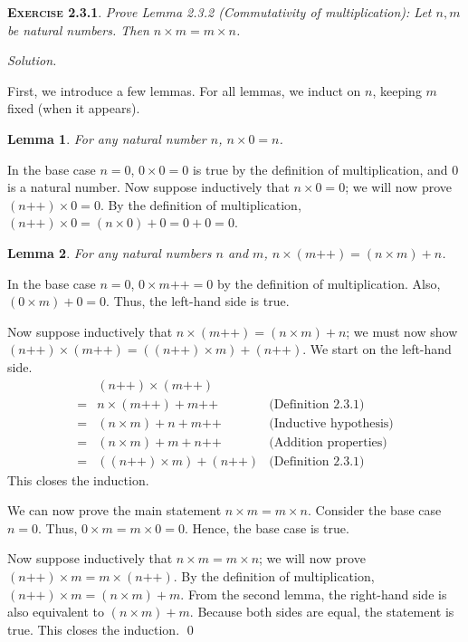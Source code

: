 \documentclass[12pt]{article}
\newcommand{\succr}[1]{#1 \textrm{++}}
\newtheorem*{lemma}{Lemma}
\theoremstyle{remark}
\newenvironment{exer}[2]{
    \noindent \setlength{\parskip}{1em}%
    \textsc{\textbf{Exercise #1}}. \textit{#2} \par
    \noindent \textit{Solution.} %
}{\bigskip}
\begin{document}
\begin{exer}{2.3.1}{
    Prove Lemma 2.3.2 (Commutativity of multiplication):
    Let $n, m$ be natural numbers.
    Then $n \times m = m \times n$.
}
    First, we introduce a few lemmas.
    For all lemmas, we induct on $n$, keeping $m$ fixed (when it appears).
    \begin{lemma}
        For any natural number $n$, $n \times 0 = n$.
    \end{lemma}
    \begin{prf}
        In the base case $n = 0$, $0 \times 0 = 0$ is true by the definition of multiplication, and $0$ is a natural number.
        Now suppose inductively that $n \times 0 = 0$; we will now prove $(\succr{n}) \times 0 = 0$.
        By the definition of multiplication, $(\succr{n}) \times 0 = (n \times 0) + 0 = 0 + 0 = 0$.
    \end{prf}
    \begin{lemma}
        For any natural numbers $n$ and $m$, $n \times (\succr{m}) = (n \times m) + n$.
    \end{lemma}
    \begin{prf}
        In the base case $n = 0$, $0 \times \succr{m} = 0$ by the definition of multiplication. 
        Also, $(0 \times m) + 0 = 0$.
        Thus, the left-hand side is true.
        
        Now suppose inductively that $n \times (\succr{m}) = (n \times m) + n$;
        we must now show $(\succr{n}) \times (\succr{m}) = ((\succr{n}) \times m) + (\succr{n})$.
        We start on the left-hand side.
        \begin{align*}
              & (\succr{n}) \times (\succr{m})                                       \\
            = & n \times (\succr{m}) + \succr{m}     & \text{(Definition 2.3.1)}     \\
            = & (n \times m) + n + \succr{m}         & \text{(Inductive hypothesis)} \\
            = & (n \times m) + m + \succr{n}         & \text{(Addition properties)}  \\
            = & ((\succr{n}) \times m) + (\succr{n}) & \text{(Definition 2.3.1)}
        \end{align*}
        This closes the induction.
    \end{prf}

    We can now prove the main statement $n \times m = m \times n$.
    Consider the base case $n = 0$. Thus, $0 \times m = m \times 0 = 0$.
    Hence, the base case is true.
    
    Now suppose inductively that $n \times m = m \times n$;
    we will now prove $(\succr{n}) \times m = m \times (\succr{n})$.
    By the definition of multiplication, $(\succr{n}) \times m = (n \times m) + m$.
    From the second lemma, the right-hand side is also equivalent to $(n \times m) + m$.
    Because both sides are equal, the statement is true. This closes the induction. \qed
\end{exer}
\end{document}
